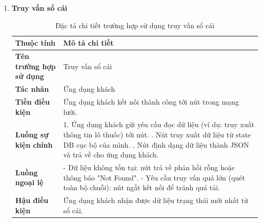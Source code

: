 \documentclass[12pt,a4paper]{article}
\begin{document}
\begin{enumerate}[label=\textbf{\alph*)}]
    \item \textbf{Truy vấn sổ cái}
    \begin{table}[H]
        \centering
        \renewcommand{\arraystretch}{1.4} %
        \begin{tabularx}{\textwidth}{|p{3.5cm}|X|}
            \hline
            \textbf{Thuộc tính} & \textbf{Mô tả chi tiết} \\ \hline
            \textbf{Tên trường hợp sử dụng} & Truy vấn sổ cái \\ \hline
            \textbf{Tác nhân} & Ứng dụng khách \\ \hline
            \textbf{Tiền điều kiện} & Ứng dụng khách kết nối thành công tới nút trong mạng lưới. \\ \hline
            \textbf{Luồng sự kiện chính} & 
            1. Ứng dụng khách gửi yêu cầu đọc dữ liệu (ví dụ: truy xuất thông tin lô thuốc) tới nút. \newline
            2. Nút truy xuất dữ liệu từ state DB cục bộ của mình. \newline
            3. Nút định dạng dữ liệu thành JSON và trả về cho ứng dụng khách. \\ \hline
            \textbf{Luồng ngoại lệ} & 
            - Dữ liệu không tồn tại: nút trả về phản hồi rỗng hoặc thông báo "Not Found". \newline
            - Yêu cầu truy vấn quá lớn (quét toàn bộ chuỗi): nút ngắt kết nối để tránh quá tải. \\ \hline
            \textbf{Hậu điều kiện} & Ứng dụng khách nhận được dữ liệu trạng thái mới nhất từ sổ cái. \\ \hline
        \end{tabularx}
        \caption{Đặc tả chi tiết trường hợp sử dụng truy vấn sổ cái}
        \label{tab:dac_ta_truy_van_so_cai}
    \end{table}
\end{enumerate}

\newpage
\end{document}
